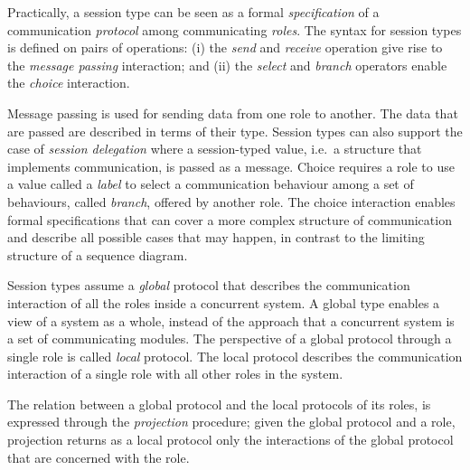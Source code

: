 Practically, a session type can be seen as a formal
{\em specification} of a communication {\em protocol} among communicating {\em roles}.
The syntax for session types is defined on pairs of operations:
(i) the {\em send} and {\em receive} operation give rise to
the {\em message passing} interaction; and
(ii) the {\em select} and {\em branch} operators enable the
{\em choice} interaction.

Message passing is used for sending data from one role to another.
The data that are passed are described in terms of their type. Session
types can also support the case of {\em session delegation}
where a session-typed value, i.e.~a structure that implements communication,
is passed as a message.
Choice requires a role to use a value called a {\em label}
to select a communication behaviour among
a set of behaviours, called {\em branch}, offered by another role.
The choice interaction enables formal specifications that can
cover a more complex structure of communication and describe all possible
cases that may happen, in contrast to the limiting structure of
a sequence diagram.

Session types assume a {\em global} protocol that describes the
communication interaction of all the roles inside a concurrent system.
A global type enables a view of a system as a whole, instead of the 
approach that a concurrent system is a set of communicating modules.
The perspective of a global protocol through a single role
is called {\em local} protocol. The local protocol describes
the communication interaction of a single role with all other roles
in the system.

The relation between a global protocol and the
local protocols of its roles, is expressed
through the {\em projection} procedure;
given the global protocol and a role, projection
returns as a local protocol only the
interactions of the global protocol that are concerned with
the role.

